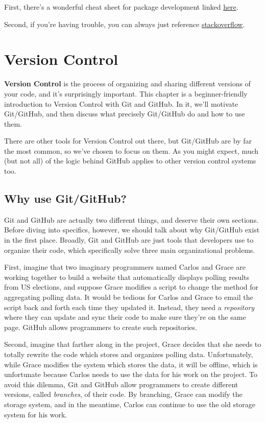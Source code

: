 \documentclass[]{book}
\begin{document}
First, there's a wonderful cheat sheet for package development linked
\href{https://www.rstudio.com/wp-content/uploads/2015/06/devtools-cheatsheet.pdf}{here}.

Second, if you're having trouble, you can always just reference
\href{https://stackoverflow.com/questions/tagged/r}{stackoverflow}.

\chapter{Version Control}\label{version-control}

\textbf{Version Control} is the process of organizing and sharing
different versions of your code, and it's surprisingly important. This
chapter is a beginner-friendly introduction to Version Control with Git
and GitHub. In it, we'll motivate Git/GitHub, and then discuss what
precisely Git/GitHub do and how to use them.

There are other tools for Version Control out there, but Git/GitHub are
by far the most common, so we've chosen to focus on them. As you might
expect, much (but not all) of the logic behind GitHub applies to other
version control systems too.

\section{Why use Git/GitHub?}\label{why-use-gitgithub}

Git and GitHub are actually two different things, and deserve their own
sections. Before diving into specifics, however, we should talk about
why Git/GitHub exist in the first place. Broadly, Git and GitHub are
just tools that developers use to organize their code, which
specifically solve three main organizational problems.

First, imagine that two imaginary programmers named Carlos and Grace are
working together to build a website that automatically displays polling
results from US elections, and suppose Grace modifies a script to change
the method for aggregating polling data. It would be tedious for Carlos
and Grace to email the script back and forth each time they updated it.
Instead, they need a \emph{repository} where they can update and sync
their code to make sure they're on the same page. GitHub allows
programmers to create such repositories.

Second, imagine that farther along in the project, Grace decides that
she needs to totally rewrite the code which stores and organizes polling
data. Unfortunately, while Grace modifies the system which stores the
data, it will be offline, which is unfortunate because Carlos needs to
use the data for his work on the project. To avoid this dilemma, Git and
GitHub allow programmers to create different versions, called
\emph{branches}, of their code. By branching, Grace can modify the
storage system, and in the meantime, Carlos can continue to use the old
storage system for his work.
\end{document}
